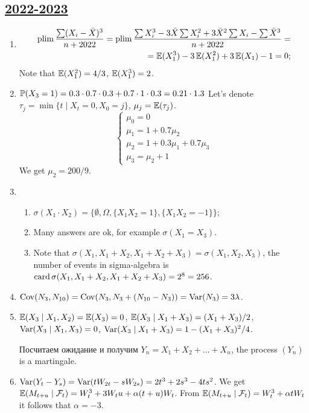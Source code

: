 \subsection[2022-2023]{\hyperref[sec:kr_01_2022_2023]{2022-2023}}
\label{sec:sol_kr_01_2022_2023} %

\begin{enumerate}
    \item 
    \begin{align*}
        \plim \frac{\sum (X_i - \bar X)^3}{n+2022} = \plim \frac{\sum X_i^3 - 3\bar X\sum X_i^2 +3\bar X^2 \sum X_i - \sum \bar X^3}{n+2022} = \\
        = \E(X_1^3) - 3\E(X_1^2) + 3\E(X_1) - 1 = 0;
    \end{align*}
    Note that $\E(X_1^2) = 4/3$, $\E(X_1^3) = 2$.
    \item $\P(X_3 = 1) = 0.3\cdot 0.7\cdot 0.3 + 0.7\cdot 1\cdot 0.3 = 0.21 \cdot 1.3$
    Let's denote $\tau_j = \min \{t \mid X_t = 0, X_0 = j\}$, $\mu_j = \E(\tau_j)$.
    \[
    \begin{cases}
        \mu_0 = 0 \\
        \mu_1 = 1 + 0.7\mu_2 \\
        \mu_2 = 1 + 0.3\mu_1 + 0.7\mu_3 \\
        \mu_3 = \mu_2 + 1 
    \end{cases}    
    \]
    We get $\mu_2 = 200/9$.
    \item \begin{enumerate}
        \item $\sigma(X_1 \cdot X_2) = \{\emptyset, \Omega, \{X_1 X_2 = 1\}, \{X_1 X_2 = -1\}\}$;
        \item Many answers are ok, for example $\sigma(X_1 = X_3)$.
        \item Note that $\sigma(X_1, X_1 + X_2, X_1+ X_2+X_3) = \sigma(X_1, X_2, X_3)$, the number of events in sigma-algebra is
        $\card \sigma(X_1, X_1 + X_2, X_1+ X_2+X_3) = 2^8 = 256$.
    \end{enumerate}
    \item $\Cov(N_3, N_{10}) = \Cov(N_3, N_3 + (N_{10} - N_3)) = \Var(N_3) = 3\lambda$.
    \item $\E(X_3 \mid X_1, X_2) = \E(X_3) = 0$, $\E(X_3 \mid X_1 + X_3) = (X_1 + X_3) / 2$, $\Var(X_3 \mid X_1, X_3) = 0$,
    $\Var(X_3 \mid X_1 + X_3) = 1 - (X_1 + X_3)^2/4$.
    
    Посчитаем ожидание и получим $Y_n = X_1 + X_2 + \ldots + X_n$, the process $(Y_n)$ is a martingale.
    \item $\Var(Y_t - Y_s) = \Var(tW_{2t} - sW_{2s}) = 2t^3 + 2s^3 - 4ts^2$.
    We get $\E(M_{t+u} \mid \mathcal F_t ) = W_t^3 + 3W_t u  + \alpha(t + u) W_t$.
    From $\E(M_{t+u} \mid \mathcal F_t ) = W_t^3 + \alpha t W_t$ it follows that $\alpha = -3$.
\end{enumerate}


